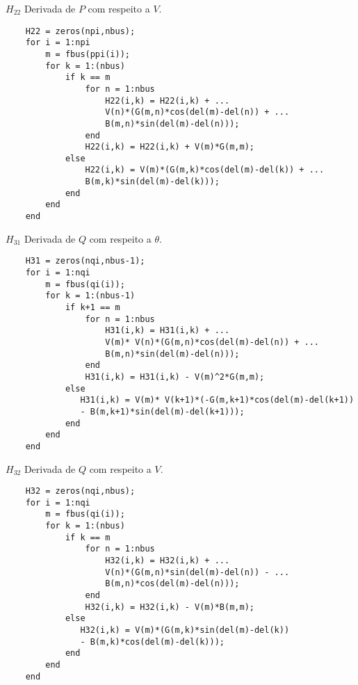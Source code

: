 $H_{22}$ Derivada de $P$ com respeito a $V$.
\begin{verbatim}    
    H22 = zeros(npi,nbus);
    for i = 1:npi
        m = fbus(ppi(i));
        for k = 1:(nbus)
            if k == m
                for n = 1:nbus
                    H22(i,k) = H22(i,k) + ...
                    V(n)*(G(m,n)*cos(del(m)-del(n)) + ...
                    B(m,n)*sin(del(m)-del(n)));
                end
                H22(i,k) = H22(i,k) + V(m)*G(m,m);
            else
                H22(i,k) = V(m)*(G(m,k)*cos(del(m)-del(k)) + ...
                B(m,k)*sin(del(m)-del(k)));
            end
        end
    end
\end{verbatim}
$H_{31}$ Derivada de $Q$ com respeito a $\theta$.
\begin{verbatim}    
    H31 = zeros(nqi,nbus-1);
    for i = 1:nqi
        m = fbus(qi(i));
        for k = 1:(nbus-1)
            if k+1 == m
                for n = 1:nbus
                    H31(i,k) = H31(i,k) + ...
                    V(m)* V(n)*(G(m,n)*cos(del(m)-del(n)) + ...
                    B(m,n)*sin(del(m)-del(n)));
                end
                H31(i,k) = H31(i,k) - V(m)^2*G(m,m);
            else
               H31(i,k) = V(m)* V(k+1)*(-G(m,k+1)*cos(del(m)-del(k+1)) 
               - B(m,k+1)*sin(del(m)-del(k+1)));
            end
        end
    end
\end{verbatim}
$H_{32}$ Derivada de $Q$ com respeito a $V$.
\begin{verbatim}    
    H32 = zeros(nqi,nbus);
    for i = 1:nqi
        m = fbus(qi(i));
        for k = 1:(nbus)
            if k == m
                for n = 1:nbus
                    H32(i,k) = H32(i,k) + ...
                    V(n)*(G(m,n)*sin(del(m)-del(n)) - ...
                    B(m,n)*cos(del(m)-del(n)));
                end
                H32(i,k) = H32(i,k) - V(m)*B(m,m);
            else
               H32(i,k) = V(m)*(G(m,k)*sin(del(m)-del(k)) 
               - B(m,k)*cos(del(m)-del(k)));
            end
        end
    end
\end{verbatim}
